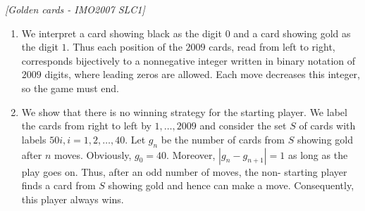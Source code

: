 \begin{problem}
\textit{[Golden cards - IMO2007 SLC1]}

\begin{enumerate}
\item We interpret a card showing black as the digit $0$ and a card showing gold as the digit $1$. Thus each position of the $2009$ cards, read from left to right, corresponds bijectively to a nonnegative integer written in binary notation of $2009$ digits, where leading zeros are allowed. Each move decreases this integer, so the game must end.
\item We show that there is no winning strategy for the starting player. We label the cards from right to left by $1, \dots , 2009$ and consider the set $S$ of cards with labels $50i, i = 1, 2, \dots , 40$. Let $g_n$ be the number of cards from $S$ showing gold after $n$ moves. Obviously, $g_0 = 40$. Moreover, $|g_n − g_{n+1}| = 1$ as long as the play goes on. Thus, after an odd number of moves, the non- starting player ﬁnds a card from $S$ showing gold and hence can make a move. Consequently, this player always wins. 

\end{enumerate}
\end{problem}
%



